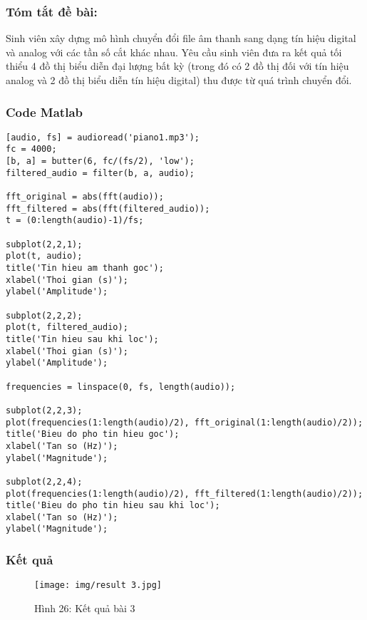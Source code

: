 \documentclass[a4paper,13pt]{article}
\begin{document}
\subsubsection*{Tóm tắt đề bài: } Sinh viên xây dựng mô hình chuyển đổi file âm thanh sang dạng tín hiệu digital và analog với các tần số cắt khác nhau. Yêu cầu sinh viên đưa ra kết quả tối thiểu 4 đồ thị biểu diễn đại lượng bất kỳ (trong đó có 2 đồ thị đối với tín hiệu analog và 2 đồ thị biểu diễn tín hiệu digital) thu được từ quá trình chuyển đổi.
\subsubsection*{Code Matlab}
\begin{lstlisting}
[audio, fs] = audioread('piano1.mp3');
fc = 4000;
[b, a] = butter(6, fc/(fs/2), 'low');
filtered_audio = filter(b, a, audio);

fft_original = abs(fft(audio));
fft_filtered = abs(fft(filtered_audio));
t = (0:length(audio)-1)/fs;

subplot(2,2,1);
plot(t, audio);
title('Tin hieu am thanh goc');
xlabel('Thoi gian (s)');
ylabel('Amplitude');

subplot(2,2,2);
plot(t, filtered_audio);
title('Tin hieu sau khi loc');
xlabel('Thoi gian (s)');
ylabel('Amplitude');

frequencies = linspace(0, fs, length(audio));

subplot(2,2,3);
plot(frequencies(1:length(audio)/2), fft_original(1:length(audio)/2));
title('Bieu do pho tin hieu goc');
xlabel('Tan so (Hz)');
ylabel('Magnitude');

subplot(2,2,4);
plot(frequencies(1:length(audio)/2), fft_filtered(1:length(audio)/2));
title('Bieu do pho tin hieu sau khi loc');
xlabel('Tan so (Hz)');
ylabel('Magnitude');
\end{lstlisting}
\clearpage
\subsubsection*{Kết quả}
\begin{figure}[htbp]
    \centering
    \texttt{[image: img/result 3.jpg]}
    \caption*{Hình 26: Kết quả bài 3}
    \label{fig:model}
\end{figure}
\end{document}
